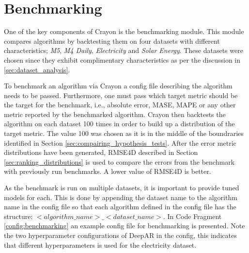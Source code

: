 \section{Benchmarking}
\label{subsec:benchmarking}
One of the key components of Crayon is the benchmarking module. This module compares algorithms by backtesting them on four datasets with different characteristics; \textit{M5}, \textit{M4 Daily}, \textit{Electricity} and \textit{Solar Energy}. These datasets were chosen since they exhibit complimentary characteristics as per the discussion in \ref{sec:dataset_analysis}.

To benchmark an algorithm via Crayon a config file describing the algorithm needs to be passed. Furthermore, one must pass which target metric should be the target for the benchmark, i.e., absolute error, MASE, MAPE or any other metric reported by the benchmarked algorithm. Crayon then backtests the algorithm on each dataset 100 times in order to build up a distribution of the target metric. The value 100 was chosen as it is in the middle of the boundraries identified in Section \ref{sec:compairing_hypothesis_tests}. After the error metric distributions have been generated, RMSE4D described in Section \ref{sec:ranking_distributions} is used to compare the errors from the benchmark with previously run benchmarks. A lower value of RMSE4D is better.

As the benchmark is run on multiple datasets, it is important to provide tuned models for each. This is done by appending the dataset name to the algorithm name in the config file so that each algorithm defined in the config file has the structure: \(<algorithm\_name>\_<dataset\_name>\). In Code Fragment \ref{config:benchmarking} an example config file for benchmarking is presented. Note the two hyperparameter configurations of DeepAR in the config, this indicates that different hyperparameters is used for the electricity dataset.

